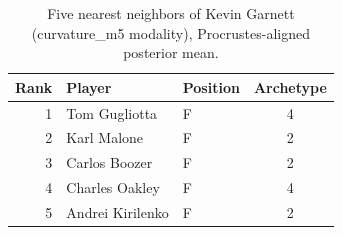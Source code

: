 \begin{table}[htbp]
  \centering\small
  \begin{tabular}{rllc}
    \toprule
    Rank & Player & Position & Archetype \\
    \midrule
    1 & Tom Gugliotta & F & 4 \\
    2 & Karl Malone & F & 2 \\
    3 & Carlos Boozer & F & 2 \\
    4 & Charles Oakley & F & 4 \\
    5 & Andrei Kirilenko & F & 2 \\
    \bottomrule
  \end{tabular}
  \caption{Five nearest neighbors of Kevin Garnett (curvature_m5 modality), Procrustes-aligned posterior mean.}
  \label{tab:Kevin_Garnett_neighbors_curvature_m5}
\end{table}

